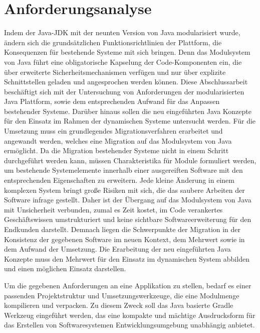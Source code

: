 \section{Anforderungsanalyse} 
	Indem der Java-JDK mit der neunten Version von Java modularisiert wurde, ändern sich die grundsätzlichen Funktionsrichtlinien der Plattform, die Konsequenzen für bestehende Systeme mit sich bringen. Denn das Modulsystem von Java führt eine obligatorische Kapselung der Code-Komponenten ein, die über erweiterte Sicherheitsmechanismen verfügen und nur über explizite Schnittstellen geladen und angesprochen werden können.\newline 
	Diese Abschlussarbeit beschäftigt sich mit der Untersuchung von Anforderungen der modularisierten Java Plattform, sowie dem entsprechenden Aufwand für das Anpassen bestehender Systeme. Darüber hinaus sollen die neu eingeführten Java Konzepte für den Einsatz im Rahmen der dynamischen Systeme untersucht werden.\newline
	Für die Umsetzung muss ein grundlegendes Migrationsverfahren erarbeitet und angewandt werden, welches eine Migration auf das Modulsystem von Java ermöglicht. Da die Migration bestehender Systeme nicht in einem Schritt durchgeführt werden kann, müssen Charakteristika für Module formuliert werden, um bestehende Systemelemente innerhalb einer ausgereiften Software mit den entsprechenden Eigenschaften zu erweitern.\newline
	Jede kleine Änderung in einem komplexen System bringt große Risiken mit sich, die das saubere Arbeiten der Software infrage gestellt. Daher ist der Übergang auf das Modulsystem von Java mit Unsicherheit verbunden, zumal es Zeit kostet, im Code verankertes Geschäftswissen umstrukturiert und keine sichtbare Softwareerweiterung für den Endkunden darstellt. Demnach liegen die Schwerpunkte der Migration in der Konsistenz der gegebenen Software im neuen Kontext, dem Mehrwert sowie in dem Aufwand der Umsetzung. \newline
	Die Erarbeitung der neu eingeführten Java Konzepte muss den Mehrwert für den Einsatz im dynamischen System abbilden und einen möglichen Einsatz darstellen.

	Um die gegebenen Anforderungen an eine Applikation zu stellen, bedarf es einer passenden Projektstruktur und Umsetzungswerkzeuge, die eine Modulmenge kompilieren und verpacken. Zu diesem Zweck soll das Java basierte Gradle Werkzeug eingeführt werden, das eine kompakte und mächtige Ausdrucksform für das Erstellen von Softwaresystemen Entwicklungsumgebung unabhängig anbietet. \bigbreak

